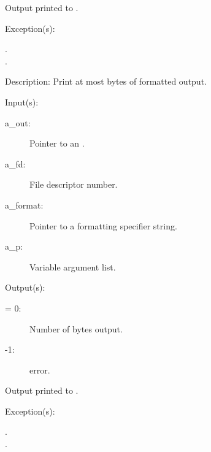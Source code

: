 \begin{capi}
\begin{capilist}
\begin{description}
		\item{Output printed to .}
		\end{description}
	\item[Exception(s): ]
		\begin{description}\item[]
		\item[.]
		\item[.]
		\end{description}
	\item[Description: ]
		Print at most  bytes of formatted output.
	\end{capilist}
\label{out_put_fv}
	\begin{capilist}
	\item[Input(s): ]
		\begin{description}\item[]
		\item[a\_out: ]
			Pointer to an .
		\item[a\_fd: ]
			File descriptor number.
		\item[a\_format: ]
			Pointer to a formatting specifier string.
		\item[a\_p: ]
			Variable argument list.
		\end{description}
	\item[Output(s): ]
		\begin{description}\item[]
		\item[retval: ]
			\begin{description}\item[]
			\item[{\gt}= 0: ]
				Number of bytes output.
			\item[-1: ]
				 error.
			\end{description}
		\item{Output printed to .}
		\end{description}
	\item[Exception(s): ]
		\begin{description}\item[]
		\item[.]
		\item[.]

\end{description}
\end{capilist}
\end{capi}
